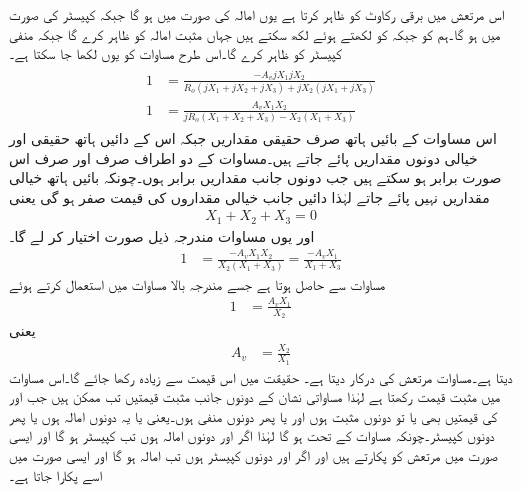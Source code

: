 اس مرتعش میں  برقی رکاوٹ کو ظاہر کرتا ہے یوں امالہ کی صورت میں  ہو گا جبکہ کپیسٹر کی صورت میں   ہو گا۔ہم  کو  جبکہ  کو  لکھتے ہوئے  لکھ سکتے ہیں جہاں مثبت  امالہ کو ظاہر کرے گا جبکہ منفی  کپیسٹر کو ظاہر کرے گا۔اس طرح  مساوات  کو یوں لکھا جا سکتا ہے۔
\begin{gather}
\begin{aligned} \label{مساوات_عمومی_مرتعش_بنیادی}
1 &=\frac{-A_v j X_1 j X_2}{R_o \left(jX_1+jX_2+jX_3 \right)+jX_2 \left(jX_1+jX_3 \right )}\\
1&=\frac{A_v X_1 X_2 }{j R_o  \left(X_1+X_2+X_3 \right)-X_2 \left(X_1+X_3 \right )}
\end{aligned}
\end{gather}
اس مساوات کے بائیں ہاتھ صرف حقیقی مقداریں  جبکہ اس کے دائیں ہاتھ حقیقی اور خیالی دونوں مقداریں پائے جاتے ہیں۔مساوات کے دو اطراف صرف اور صرف اس صورت برابر ہو سکتے ہیں جب دونوں جانب مقداریں برابر ہوں۔چونکہ بائیں ہاتھ خیالی مقداریں نہیں پائے جاتے لہٰذا دائیں جانب خیالی مقداروں کی قیمت صفر ہو گی یعنی
\begin{align} \label{مساوات_عمومی_مرتعش_خیالی_جزو_صفر}
X_1+X_2+X_3=0
\end{align}
اور یوں مساوات  مندرجہ ذیل صورت اختیار کر لے گا۔
\begin{align*}
1&=\frac{-A_v X_1 X_2}{X_2 \left(X_1+X_3 \right )}=\frac{-A_v X_1}{X_1+X_3}
\end{align*}
مساوات  سے  حاصل ہوتا ہے جسے مندرجہ بالا مساوات میں استعمال کرتے ہوئے
 \begin{align*}
1&=\frac{A_v X_1}{X_2}
\end{align*}
یعنی
\begin{align}\label{مساوات_مرتعش_عمومی_افزائش}
A_v &=\frac{X_2}{X_1}
\end{align}
دیتا ہے۔مساوات  مرتعش کی درکار  دیتا ہے۔ حقیقت میں  اس قیمت سے زیادہ رکھا جائے گا۔اس مساوات میں  مثبت قیمت رکھتا ہے لہٰذا مساواتی نشان کے دونوں جانب مثبت قیمتیں تب ممکن ہیں جب  اور  کی قیمتیں بھی یا تو دونوں مثبت ہوں اور یا پھر دونوں منفی ہوں۔یعنی یا یہ دونوں امالہ ہوں یا پھر دونوں کپیسٹر۔چونکہ مساوات  کے تحت  ہو گا لہٰذا اگر  اور  دونوں امالہ ہوں تب  کپیسٹر ہو گا اور ایسی صورت میں مرتعش کو  پکارتے ہیں اور اگر  اور  دونوں کپیسٹر ہوں تب  امالہ ہو گا اور ایسی صورت میں اسے  پکارا جاتا ہے۔

